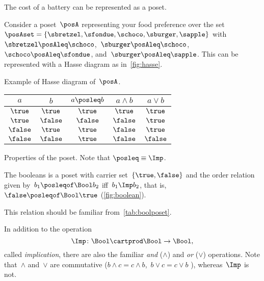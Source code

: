 \begin{marginfigure}
	\centering
	\caption{The cost of a battery can be represented as a poset.}
	\label{fig:hassebattery}
\end{marginfigure}

\begin{example}
	Consider a poset~$\posA$ representing your food preference over the set~$\posAset=\{\sbretzel,\sfondue,\schoco,\sburger,\sapple\}$ with~$\sbretzel\posAleq \schoco$,~$\sburger\posAleq \schoco$,~$\schoco\posAleq \sfondue$, and~$\sburger\posAleq \sapple$.
	This can be represented with a Hasse diagram as in~\cref{fig:hasse}.
\end{example}

\begin{marginfigure}
	\centering
	\caption{Example of Hasse diagram of~$\posA$.}
	\label{fig:hasse}
\end{marginfigure}

\begin{marginfigure}
	\centering
	\caption{}
	\label{fig:boolean}
\end{marginfigure}

\begin{margintable}
	\centering
	\begin{tabular}{cc|ccc}
		$a$      & $b$      & $a \posleq  b$ & $a \wedge b$ & $a \vee b$ \\ \hline
		$\true$  & $\true$  & $\true$        & $\true$      & $\true$    \\
		$\true$  & $\false$ & $\false$       & $\false$     & $\true$    \\
		$\false$ & $\true$  & $\true$        & $\false$     & $\true$    \\
		$\false$ & $\false$ & $\true$        & $\false$     & $\false$
	\end{tabular}
	\caption{Properties of the \Bool poset.
		Note that $\posleq \equiv \Imp$.
	}
	\label{tab:boolposet}
\end{margintable}

\begin{example}[Booleans]
	\label{ex:bool}
	The booleans \index{\Bool} is a poset with carrier set~$\{\true,\false\}$ and the order relation given by~$b_1 \posleqof\Bool b_2$ iff~$b_1 \Imp b_2$, that is,~$\false \posleqof\Bool \true$ (\cref{fig:boolean}).

	This relation should be familiar from~\cref{tab:boolposet}.

	In addition to the operation
	\begin{equation*}
		\Imp\colon\Bool\cartprod \Bool\to\Bool,
	\end{equation*}
	called \emph{implication}, there are also the familiar \emph{and} ($\wedge$) and \emph{or} ($\vee$) operations.
	Note that~$\wedge$ and~$\vee$ are commutative ($b\wedge c = c\wedge b$,~$b\vee c = c\vee b$ ), whereas~$\Imp$ is not.
\end{example}

